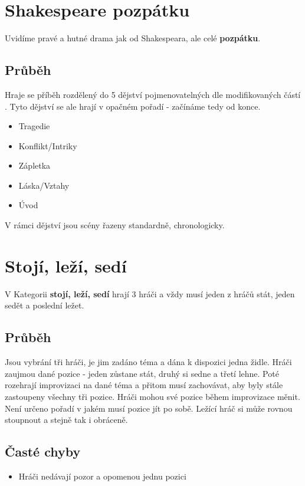 \needspace{5cm} \section{Shakespeare pozpátku} \label{shakespeare pozpátku}  
 
Uvidíme pravé a hutné drama jak od Shakespeara, ale celé \textbf{pozpátku}{}. 
\subsection{Průběh} Hraje se příběh rozdělený do 5 dějství pojmenovatelných dle modifikovaných částí .  
Tyto dějství se ale hrají v opačném pořadí - začínáme tedy od konce.  
\begin{itemize}
\item Tragedie
\item Konflikt/Intriky
\item Zápletka
\item Láska/Vztahy
\item Úvod
\end{itemize}
 
V rámci dějství jsou scény řazeny standardně, chronologicky.  
 
 
 
\needspace{5cm} \section{Stojí, leží, sedí} \label{stojí, leží, sedí}  
 
V Kategorii \textbf{stojí, leží, sedí}{} hrají 3 hráči a vždy musí jeden z hráčů stát, jeden sedět a poslední ležet. 
 
\subsection{ Průběh } Jsou vybrání tři hráči, je jim zadáno téma a dána k dispozici jedna židle. Hráči zaujmou dané pozice - jeden zůstane stát, druhý si sedne a třetí lehne. Poté rozehrají improvizaci na dané téma a přitom musí zachovávat, aby byly stále zastoupeny všechny tři pozice. Hráči mohou své pozice během improvizace měnit. Není určeno pořadí v jakém musí pozice jít po sobě. Ležící hráč si může rovnou stoupnout a stejně tak i obráceně.  
 
\subsection{ Časté chyby } \begin{itemize}
\item Hráči nedávají pozor a opomenou jednu pozici
\end{itemize}
 
